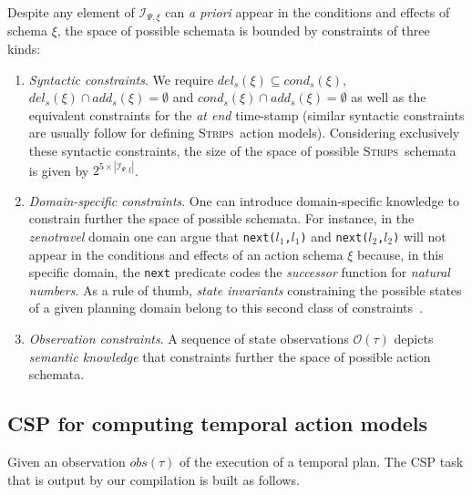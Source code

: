 \documentclass[letterpaper]{article} %
\newcommand{\strips}{\textsc{Strips}}     %
\begin{document}
Despite any element of ${\mathcal I}_{\Psi,\xi}$ can {\em a priori} appear in the conditions and effects of schema $\xi$, the space of possible schemata is bounded by constraints of three kinds:
\begin{enumerate}
\item {\em Syntactic constraints}. We require $del_s(\xi)\subseteq cond_s(\xi)$, $del_s(\xi)\cap add_s(\xi)=\emptyset$ and $cond_s(\xi)\cap add_s(\xi)=\emptyset$ as well as the equivalent constraints for the {\em at end} time-stamp (similar syntactic constraints are usually follow for defining  \strips\ action models). Considering exclusively these syntactic constraints, the size of the space of possible \strips\ schemata is given by $2^{5\times|{\mathcal I}_{\Psi,\xi}|}$. 
\item {\em Domain-specific constraints}. One can introduce domain-specific knowledge to constrain further the space of possible schemata. For instance, in the {\em zenotravel} domain one can argue that {\small\tt next($l_1$,$l_1$)} and {\small\tt next($l_2$,$l_2$)} will not appear in the conditions and effects of an action schema $\xi$ because, in this specific domain, the {\tt\small next} predicate codes the {\em successor} function for {\em natural numbers}. As a rule of thumb, {\it state invariants} constraining the possible states of a given planning domain belong to this second class of constraints~\cite{fox:TIM:JAIR1998}. 

\item {\em Observation constraints}. A sequence of state observations $\mathcal{O}(\tau)$ depicts {\em semantic knowledge} that constraints further the space of possible action schemata. 
\end{enumerate}


\subsection{CSP for computing temporal action models}
Given an observation $obs(\tau)$ of the execution of a temporal plan. The CSP task that is output by our compilation is built as follows.
\end{document}
